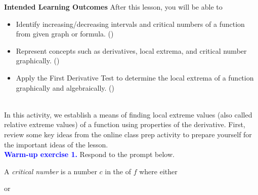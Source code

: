 \documentclass[10pt]{article}
\begin{document}
\pagestyle{otherpages}
\thispagestyle{firstpage}

\textbf{Intended Learning Outcomes}
After this lesson, you will be able to 

\begin{itemize}
    \item Identify increasing/decreasing intervals and critical numbers of a function from given graph or formula. ()
    \item Represent concepts such as derivatives, local extrema, and critical number graphically. ()
    \item Apply the First Derivative Test to determine the local extrema of a function graphically and algebraically. ()
\end{itemize}

\vspace{-0.5cm}

\hrulefill\\
In this activity, we establish a means of finding local extreme values (also called relative extreme values) of a function using properties of the derivative. First, review some key ideas from the online class prep activity to prepare yourself for the important ideas of the lesson.\\

{\bf \textcolor{blue}{Warm-up exercise 1.}}  Respond to the prompt below.
%
    {
    A {\em critical number} is  a number $c$ in the  of $f$ where either
  \begin{center}  \quad\quad\quad or \quad\quad\quad {} \end{center}
    }
    
\end{document}
